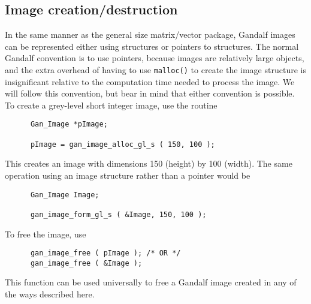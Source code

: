 \subsection{Image creation/destruction}
In the same manner as the general size matrix/vector package, Gandalf images
can be represented either using structures or pointers to structures.
The normal Gandalf convention is to use pointers, because images are
relatively large objects, and the extra overhead of having to use
{\tt malloc()} to create the image structure is insignificant relative to
the computation time needed to process the image. We will follow this
convention, but bear in mind that either convention is possible.
To create a grey-level short integer image, use the routine
\begin{verbatim}
      Gan_Image *pImage;

      pImage = gan_image_alloc_gl_s ( 150, 100 );
\end{verbatim}
This creates an image with dimensions 150 (height) by 100 (width).
The same operation using an image structure rather than a pointer would be
\begin{verbatim}
      Gan_Image Image;

      gan_image_form_gl_s ( &Image, 150, 100 );
\end{verbatim}
To free the image, use
\begin{verbatim}
      gan_image_free ( pImage ); /* OR */
      gan_image_free ( &Image );
\end{verbatim}
This function can be used universally to free a Gandalf image created in
any of the ways described here.

